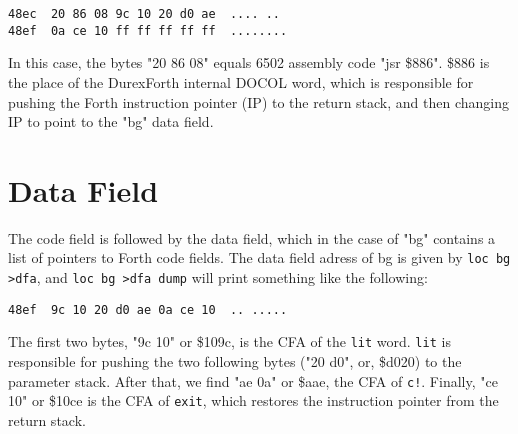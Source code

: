 \begin{verbatim}
48ec  20 86 08 9c 10 20 d0 ae  .... .. 
48ef  0a ce 10 ff ff ff ff ff  ........
\end{verbatim}

In this case, the bytes "20 86 08" equals 6502 assembly code "jsr \$886". \$886 is the place of the DurexForth internal DOCOL word, which is responsible for pushing the Forth instruction pointer (IP) to the return stack, and then changing IP to point to the "bg" data field.

\section{Data Field}

The code field is followed by the data field, which in the case of "bg" contains a list of pointers to Forth code fields. The data field adress of bg is given by \texttt{loc bg >dfa}, and \texttt{loc bg >dfa dump} will print something like the following:

\begin{verbatim}
48ef  9c 10 20 d0 ae 0a ce 10  .. .....
\end{verbatim}

The first two bytes, "9c 10" or \$109c, is the CFA of the \texttt{lit} word. \texttt{lit} is responsible for pushing the two following bytes ("20 d0", or, \$d020) to the parameter stack. After that, we find "ae 0a" or \$aae, the CFA of \texttt{c!}. Finally, "ce 10" or \$10ce is the CFA of \texttt{exit}, which restores the instruction pointer from the return stack.
